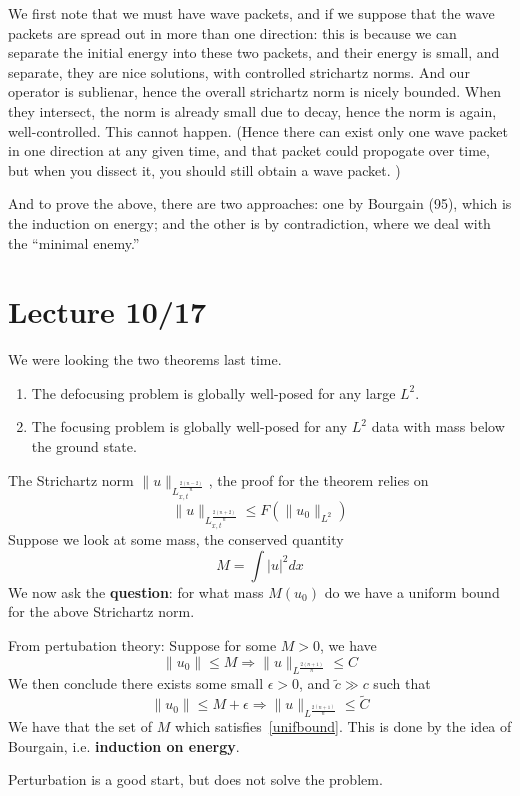 We first note that we must have wave packets, and if we suppose that the wave packets are spread out in more than one direction: this is because we can separate the initial energy into these two packets, and their energy is small, and separate, they are nice solutions, with controlled strichartz norms. And our operator is sublienar, hence the overall strichartz norm is nicely bounded. When they intersect, the norm is already small due to decay, hence the norm is again, well-controlled. This cannot happen. (Hence there can exist only one wave packet in one direction at any given time, and that packet could propogate over time, but when you dissect it, you should still obtain a wave packet. )

And to prove the above, there are two approaches: one by Bourgain (95), which is the induction on energy; and the other is by contradiction, where we deal with the ``minimal enemy.''


\section{Lecture 10/17}
We were looking the two theorems last time.
\begin{theorem}
    \begin{enumerate}
        \item The defocusing problem is globally well-posed for any large $L^2$.
        \item The focusing problem is globally well-posed for any $L^2$ data with mass below the ground state.
    \end{enumerate}
\end{theorem}
The Strichartz norm $\|u\|_{L_{x,t}^\frac{2(n-2)}{n}}$, the proof for the theorem relies on
\begin{equation*}
    \|u\|_{L_{x,t}^\frac{2(n+2)}{n}}\leq F(\|u_0\|_{L^2})
\end{equation*}
Suppose we look at some mass, the conserved quantity
\begin{equation*}
    M=\int|u|^2dx
\end{equation*}
We now ask the \textbf{question}: for what mass $M(u_0)$ do we have a uniform bound for the above Strichartz norm.

From pertubation theory:
Suppose for some $M>0$, we have
\begin{equation*}\label{unifbound}
    \|u_0\|\leq M\Rightarrow \|u\|_{L^\frac{2(n+1)}{n}}\leq C
\end{equation*}
We then conclude there exists some small $\epsilon>0$, and $\tilde{c}\gg c$ such that
\begin{equation*}
    \|u_0\|\leq M+\epsilon\Rightarrow \|u\|_{L^\frac{2(n+1)}{n}}\leq\tilde{C}
\end{equation*}
We have that the set of $M$ which satisfies~\ref{unifbound}. This is done by the idea of Bourgain, i.e. \textbf{induction on energy}.
\begin{note}
    Perturbation is a good start, but does not solve the problem.
\end{note}

